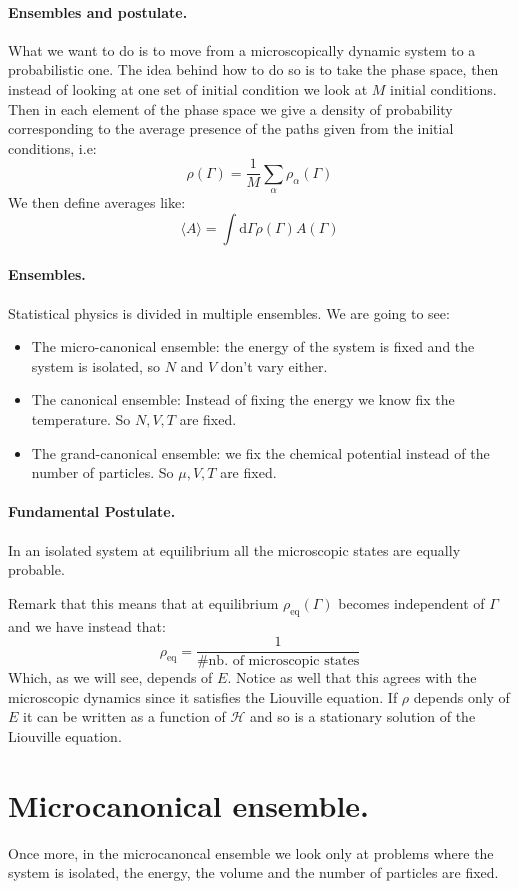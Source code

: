 \documentclass[10pt,a4paper]{book}
\begin{document}
\subsubsection{Ensembles and postulate.}
What we want to do is to move from a microscopically dynamic system to a probabilistic one. The idea behind how to do so is to take the phase space, then instead of looking at one set of initial condition we look at $M$ initial conditions. Then in each element of the phase space we give a density of probability corresponding to the average presence of the paths given from the initial conditions, i.e:
\[
\rho(\Gamma) = \frac{1}{M}\sum_\alpha \rho_\alpha (\Gamma)
\]
We then define averages like:
\[
\langle A \rangle = \int \text{d}\Gamma \rho(\Gamma)A(\Gamma)
\]
\subsubsection{Ensembles.}
Statistical physics is divided in multiple ensembles. We are going to see:
\begin{itemize}
\item The micro-canonical ensemble: the energy of the system is fixed and the system is isolated, so $N$ and $V$ don't vary either.
\item The canonical ensemble: Instead of fixing the energy we know fix the temperature. So $N,V,T$ are fixed.
\item The grand-canonical ensemble: we fix the chemical potential instead of the number of particles. So $\mu, V, T$ are fixed.
\end{itemize}
\subsubsection{Fundamental Postulate.}
\begin{center}
In an isolated system at equilibrium all the microscopic states are equally probable.
\end{center}
Remark that this means that at equilibrium $\rho_{\text{eq}}(\Gamma)$ becomes independent of $\Gamma$ and we have instead that:
\[
\rho_{\text{eq}} = \frac{1}{\# \text{nb. of microscopic states}}
\]
Which, as we will see, depends of $E$. Notice as well that this agrees with the microscopic dynamics since it satisfies the Liouville equation. If $\rho$ depends only of $E$ it can be written as a function of $\mathcal{H}$ and so is a stationary solution of the Liouville equation.

\chapter{Microcanonical ensemble.}
Once more, in the microcanoncal ensemble we look only at problems where the system is isolated, the energy, the volume and the number of particles are fixed.
\end{document}

